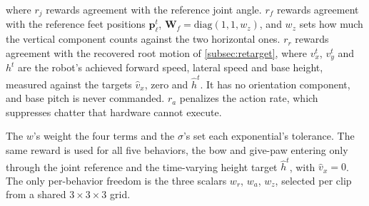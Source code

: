 \documentclass[letterpaper, 10 pt, conference]{ieeeconf}
\begin{document}
\noindent
where
$r_j$ rewards agreement with the reference joint angle.
$r_f$ rewards agreement with the reference feet positions $\mathbf{p}_\ell^t$, $\mathbf{W}_f = \mathrm{diag}(1,1,w_z)$, and $w_z$ sets how much the vertical component counts against the two horizontal ones. 
$r_r$ rewards agreement with the recovered root motion of \autoref{subsec:retarget}, where $v_x^t$, $v_y^t$ and $h^t$ are the robot's achieved forward speed, lateral speed and base height, measured against the targets $\hat v_x$, zero and $\hat h^t$. It has no orientation component, and base pitch is never commanded.
$r_a$ penalizes the action rate, which suppresses chatter that hardware cannot execute. 



The $w$'s weight the four terms and the $\sigma$'s set each exponential's tolerance. The same reward is used for all five behaviors, the bow and give-paw entering only through the joint reference and the time-varying height target $\hat h^t$, with $\hat v_x{=}0$. The only per-behavior freedom is the three scalars $w_r$, $w_a$, $w_z$, selected per clip from a shared $3{\times}3{\times}3$ grid.
\end{document}

